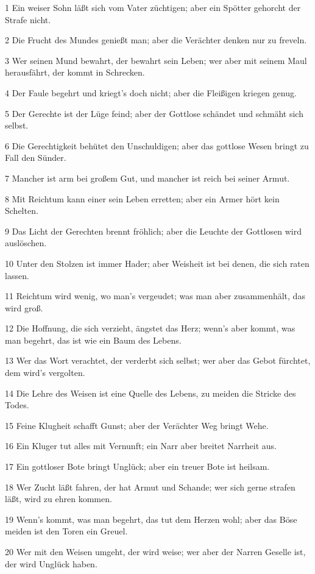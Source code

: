 \par 1 Ein weiser Sohn läßt sich vom Vater züchtigen; aber ein Spötter gehorcht der Strafe nicht.
\par 2 Die Frucht des Mundes genießt man; aber die Verächter denken nur zu freveln.
\par 3 Wer seinen Mund bewahrt, der bewahrt sein Leben; wer aber mit seinem Maul herausfährt, der kommt in Schrecken.
\par 4 Der Faule begehrt und kriegt's doch nicht; aber die Fleißigen kriegen genug.
\par 5 Der Gerechte ist der Lüge feind; aber der Gottlose schändet und schmäht sich selbst.
\par 6 Die Gerechtigkeit behütet den Unschuldigen; aber das gottlose Wesen bringt zu Fall den Sünder.
\par 7 Mancher ist arm bei großem Gut, und mancher ist reich bei seiner Armut.
\par 8 Mit Reichtum kann einer sein Leben erretten; aber ein Armer hört kein Schelten.
\par 9 Das Licht der Gerechten brennt fröhlich; aber die Leuchte der Gottlosen wird auslöschen.
\par 10 Unter den Stolzen ist immer Hader; aber Weisheit ist bei denen, die sich raten lassen.
\par 11 Reichtum wird wenig, wo man's vergeudet; was man aber zusammenhält, das wird groß.
\par 12 Die Hoffnung, die sich verzieht, ängstet das Herz; wenn's aber kommt, was man begehrt, das ist wie ein Baum des Lebens.
\par 13 Wer das Wort verachtet, der verderbt sich selbst; wer aber das Gebot fürchtet, dem wird's vergolten.
\par 14 Die Lehre des Weisen ist eine Quelle des Lebens, zu meiden die Stricke des Todes.
\par 15 Feine Klugheit schafft Gunst; aber der Verächter Weg bringt Wehe.
\par 16 Ein Kluger tut alles mit Vernunft; ein Narr aber breitet Narrheit aus.
\par 17 Ein gottloser Bote bringt Unglück; aber ein treuer Bote ist heilsam.
\par 18 Wer Zucht läßt fahren, der hat Armut und Schande; wer sich gerne strafen läßt, wird zu ehren kommen.
\par 19 Wenn's kommt, was man begehrt, das tut dem Herzen wohl; aber das Böse meiden ist den Toren ein Greuel.
\par 20 Wer mit den Weisen umgeht, der wird weise; wer aber der Narren Geselle ist, der wird Unglück haben.
